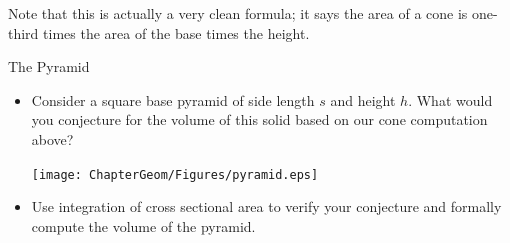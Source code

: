 Note that this is actually a very clean formula; it says the area of a cone is one-third times the area of the base times the height.
\begin{exercise}{The Pyramid \Coffeecup \Coffeecup }
\begin{itemize} \item Consider a square base pyramid of side length $s$ and height $h$.  What would you conjecture for the volume of this solid based on our cone computation above?

	\begin{center}
		\texttt{[image: ChapterGeom/Figures/pyramid.eps]}
	\end{center} 

\item Use integration of cross sectional area to verify your conjecture and formally compute the volume of the pyramid.


\end{itemize}
\end{exercise}

